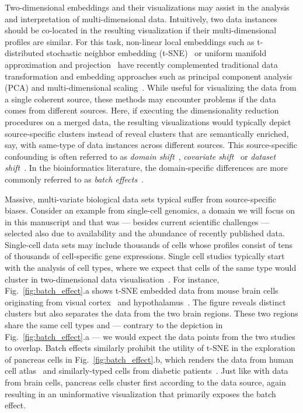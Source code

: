 \documentclass[runningheads]{llncs}
\begin{document}
Two-dimensional embeddings and their visualizations may assist in the analysis and interpretation of multi-dimensional data. Intuitively, two data instances should be co-located in the resulting visualization if their multi-dimensional profiles are similar. For this task, non-linear local embeddings such as t-distributed stochastic neighbor embedding (t-SNE)~\cite{tsne} or uniform manifold approximation and projection~\cite{umap} have recently complemented traditional data transformation and embedding approaches such as principal component analysis (PCA) and multi-dimensional scaling~\cite{distill,umap_single_cell}. While useful for visualizing the data from a single coherent source, these methods may encounter problems if the data comes from different sources. Here, if executing the dimensionality reduction procedures on a merged data, the resulting visualizations would typically depict source-specific clusters instead of reveal clusters that are semantically enriched, say, with same-type of data instances across different sources. This source-specific confounding is often referred to as {\em domain shift}~\cite{domain_shift}, {\em covariate shift}~\cite{covariate_shift} or {\em dataset shift}~\cite{dataset_shift}. In the bioinformatics literature, the domain-specific differences are more commonly referred to as {\em batch effects}~\cite{cca,mnn,seurat}.

Massive, multi-variate biological data sets typical suffer from source-specific biases. Consider an example from single-cell genomics, a domain we will focus on in this manuscript and that was --- besides current scientific challenges --- selected also due to availability and the abundance of recently published data. Single-cell data sets may include thousands of cells whose profiles consist of tens of thousands of cell-specific gene expressions. Single cell studies typically start with the analysis of cell types, where we expect that cells of the same type would cluster in two-dimensional data visualisation~\cite{seurat}. For instance, Fig.~\ref{fig:batch_effect}.a shows t-SNE embedded data from mouse brain cells originating from visual cortex~\cite{hrvatin2018} and hypothalamus~\cite{chen2017}. The figure reveals distinct clusters but also separates the data from the two brain regions. These two regions share the same cell types and --- contrary to the depiction in Fig.~\ref{fig:batch_effect}.a --- we would expect the data points from the two studies to overlap. Batch effects similarly prohibit the utility of t-SNE in the exploration of pancreas cells in Fig.~\ref{fig:batch_effect}.b, which renders the data from human cell atlas~\cite{baron2016} and similarly-typed cells from diabetic patients~\cite{xin2016}. Just like with data from brain cells, pancreas cells cluster first according to the data source, again resulting in an uninformative visualization that primarily exposes the batch effect.
\end{document}
